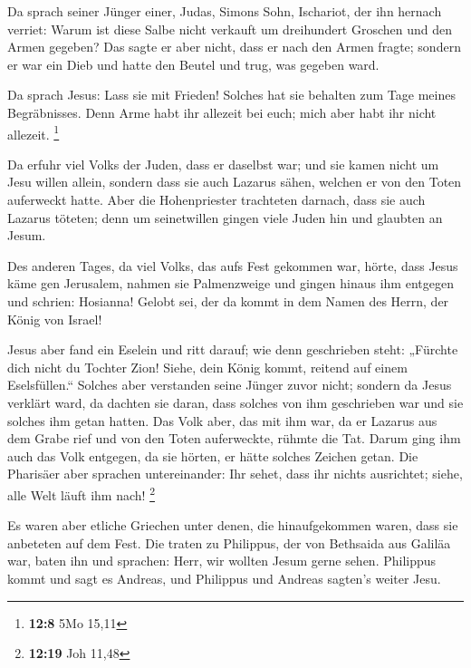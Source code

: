  Da sprach seiner Jünger einer, Judas, Simons Sohn,
Ischariot, der ihn hernach verriet:  Warum ist diese Salbe
nicht verkauft um dreihundert Groschen und den Armen gegeben?
 Das sagte er aber nicht, dass er nach den Armen fragte;
sondern er war ein Dieb und hatte den Beutel und trug, was gegeben ward.

 Da sprach Jesus: Lass sie mit Frieden! Solches hat sie
behalten zum Tage meines Begräbnisses.  Denn Arme habt ihr
allezeit bei euch; mich aber habt ihr nicht allezeit. \footnote{\textbf{12:8}
  5Mo 15,11}

 Da erfuhr viel Volks der Juden, dass er daselbst war; und
sie kamen nicht um Jesu willen allein, sondern dass sie auch Lazarus
sähen, welchen er von den Toten auferweckt hatte.  Aber
die Hohenpriester trachteten darnach, dass sie auch Lazarus töteten;
 denn um seinetwillen gingen viele Juden hin und glaubten
an Jesum.

 Des anderen Tages, da viel Volks, das aufs Fest gekommen
war, hörte, dass Jesus käme gen Jerusalem,  nahmen sie
Palmenzweige und gingen hinaus ihm entgegen und schrien: Hosianna!
Gelobt sei, der da kommt in dem Namen des Herrn, der König von Israel!

 Jesus aber fand ein Eselein und ritt darauf; wie denn
geschrieben steht:  „Fürchte dich nicht du Tochter Zion!
Siehe, dein König kommt, reitend auf einem Eselsfüllen.``
 Solches aber verstanden seine Jünger zuvor nicht;
sondern da Jesus verklärt ward, da dachten sie daran, dass solches von
ihm geschrieben war und sie solches ihm getan hatten. 
Das Volk aber, das mit ihm war, da er Lazarus aus dem Grabe rief und von
den Toten auferweckte, rühmte die Tat.  Darum ging ihm
auch das Volk entgegen, da sie hörten, er hätte solches Zeichen getan.
 Die Pharisäer aber sprachen untereinander: Ihr sehet,
dass ihr nichts ausrichtet; siehe, alle Welt läuft ihm nach! \footnote{\textbf{12:19}
  Joh 11,48}

 Es waren aber etliche Griechen unter denen, die
hinaufgekommen waren, dass sie anbeteten auf dem Fest. 
Die traten zu Philippus, der von Bethsaida aus Galiläa war, baten ihn
und sprachen: Herr, wir wollten Jesum gerne sehen. 
Philippus kommt und sagt es Andreas, und Philippus und Andreas sagten's
weiter Jesu.

